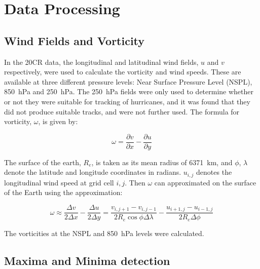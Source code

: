 \documentclass[pdftex,12pt,a4paper]{report}
\begin{document}
\section{Data Processing}

\subsection{Wind Fields and Vorticity}
\label{sec:vort}

In the 20CR data, the longitudinal and latitudinal wind fields, $u$ and $v$ respectively, were used
to calculate the vorticity and wind speeds. These are available at three different pressure levels:
Near Surface Pressure Level (NSPL), \SI{850}{hPa} and \SI{250}{hPa}. The \SI{250}{hPa} fields were
only used to determine whether or not they were suitable for tracking of hurricanes, and it was
found that they did not produce suitable tracks, and were not further used. The formula for
vorticity, $\omega$, is given by:

\begin{equation}
    \omega = \frac{\partial v}{\partial x} - \frac{\partial u}{\partial y}
    \label{eqn:vorticity}
\end{equation}

The surface of the earth, $R_e$, is taken as its mean radius of \SI{6371}{km}, and $\phi$, $\lambda$
denote the latitude and longitude coordinates in radians. $u_{i, j}$ denotes the longitudinal wind
speed at grid cell $i, j$. Then $\omega$ can approximated on the surface of the Earth using the
approximation: 


\begin{equation}
    \omega \approx \frac{\Delta v}{2 \Delta x} - \frac{\Delta u}{2 \Delta y} = \frac{v_{i,j+1} - v_{i,j-1}}{2 R_e \cos{\phi} \Delta \lambda} - \frac{u_{i+1,j} - u_{i-1,j}}{2 R_e \Delta \phi }
    \label{eqn:vorticity_2nd_order}
\end{equation}

The vorticities at the NSPL and \SI{850}{hPa} levels were calculated.

\subsection{Maxima and Minima detection}
\label{sec:methods_maxima_minima}
\end{document}
